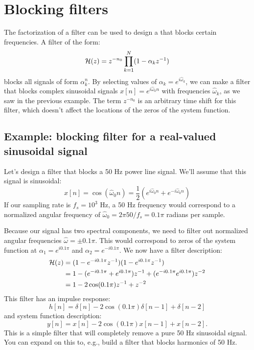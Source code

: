 \section{Blocking filters}

The factorization of a filter can be used to design a  that blocks certain frequencies. A filter of the
form:
\begin{equation}
  \mathcal{H}(z) = z^{-n_0}\prod_{k=1}^{N} (1-\alpha_k z^{-1})
  \label{eq:blocking_filter}
\end{equation}
blocks all signals of form $\alpha_k^n$. By selecting values of
$\alpha_k = e^{i\hat{\omega}_k}$, we can make a filter that blocks
complex sinusoidal signals $x[n]=e^{i\hat{\omega}_k n}$ with
frequencies $\hat{\omega}_k$, as we saw in the previous example. The
term $z^{-n_0}$ is an arbitrary time shift for this filter, which
doesn't affect the locations of the zeros of the system function.

\subsection{Example: blocking filter for a real-valued sinusoidal signal}

Let's design a filter that blocks a 50 Hz power line signal. We'll assume that this signal is sinusoidal:
\begin{equation}
  x[n]=\cos(\hat{\omega}_0 n) = \frac{1}{2}(e^{i\hat{\omega}_0 n}+e^{-i\hat{\omega}_0 n})
\end{equation}
If our sampling rate is $f_s=10^3$ Hz, a 50 Hz frequency would
correspond to a normalized angular frequency of $\hat{\omega}_0=2\pi
50/f_s = 0.1\pi$ radians per sample.

Because our signal has two spectral components, we need to filter out
normalized angular frequencies $\hat{\omega}=\pm 0.1\pi$. This would
correspond to zeros of the system function at $\alpha_1=e^{i0.1\pi}$
and $\alpha_2=e^{-i0.1\pi}$. We now have a filter description:
\begin{align}
\mathcal{H}(z) & = (1-e^{-i 0.1 \pi} z^{-1})(1-e^{i 0.1 \pi} z^{-1}) \\
     &= 1 - (e^{-i0.1\pi} + e^{i0.1\pi})z^{-1} + (e^{-i0.1\pi} e^{i0.1\pi})z^{-2}\\
      &=1 - 2\cos(0.1\pi)z^{-1} + z^{-2}
\end{align}
This filter has an impulse response:
\begin{equation}
h[n] = \delta[n] -2\cos(0.1\pi)\delta[n-1] + \delta[n-2]
\end{equation}
and system function description:
\begin{equation}
y[n] = x[n] - 2\cos(0.1\pi)x[n-1]+x[n-2].
\end{equation}
This is a simple filter that will completely remove a pure 50 Hz
sinusoidal signal. You can expand on this to, e.g., build a filter that
blocks harmonics of 50 Hz.



